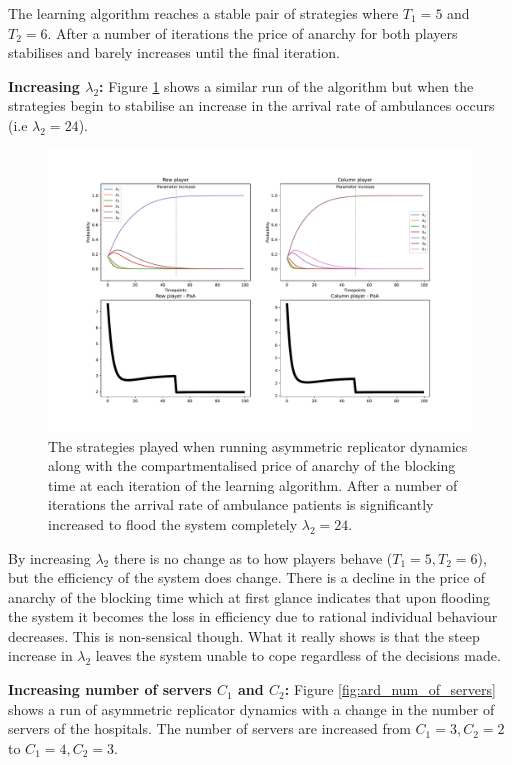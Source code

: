 The learning algorithm reaches a stable pair of 
strategies where \(T_1 = 5\) and \(T_2 = 6\). After a number of iterations the
price of anarchy for both players stabilises and barely increases until the 
final iteration. 

\textbf{Increasing \(\lambda_2\):}
Figure \ref{fig:ard_lambda_2} shows a similar run of the
algorithm but when the strategies begin to stabilise an increase in the
arrival rate of ambulances occurs (i.e \( \lambda_2 = 24 \)).


\begin{figure}[H]
    \includegraphics[width=\textwidth]{imgs/asymmetric_rd_and_PoA/asymmetric_flooding.pdf}
    \caption{The strategies played when running asymmetric replicator dynamics
    along with the compartmentalised price of anarchy of the blocking time at
    each iteration of the learning algorithm. After a number of iterations the 
    arrival rate of ambulance patients is significantly increased to flood the
    system completely \( \lambda_2 = 24 \).}
    \label{fig:ard_lambda_2}
\end{figure}


By increasing \(\lambda_2\) there is no change as to how players behave
(\(T_1 = 5, T_2 = 6\)), but the efficiency of the system does change. 
There is a decline in the price of anarchy of the blocking time which at first 
glance indicates that upon flooding the system it becomes the loss in efficiency
due to rational individual behaviour decreases. 
This is non-sensical though.
What it really shows is that the steep increase in \( \lambda_2 \) leaves 
the system unable to cope regardless of the decisions made.

\textbf{Increasing number of servers \( C_1 \) and \( C_2 \):}
Figure \ref{fig:ard_num_of_servers} shows a run of asymmetric replicator 
dynamics with a change in the number of servers of the hospitals.
The number of servers are increased from \(C_1 = 3, C_2 = 2\) to 
\(C_1 = 4, C_2 = 3\).


